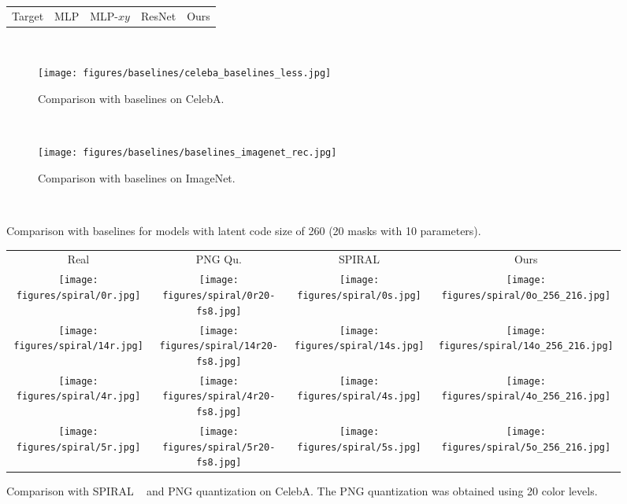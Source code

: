 \documentclass[10pt,twocolumn,letterpaper]{article}
\begin{document}
\begin{figure}[H]
\begin{center}
\begin{tabularx}{\linewidth}{@{} *5{>{\centering\arraybackslash}X}@{}}

 Target & MLP & MLP-$xy$ & ResNet & Ours \\ 
\end{tabularx}\\

\begin{subfigure}[b]{0.5\textwidth}
\texttt{[image: figures/baselines/celeba\_baselines\_less.jpg]}
\caption{Comparison with baselines on CelebA.}
\label{fig:baselineComparison_20masks_celeba}
\end{subfigure}\\
\begin{subfigure}[b]{0.5\textwidth}
\texttt{[image: figures/baselines/baselines\_imagenet\_rec.jpg]}
\caption{Comparison with baselines on ImageNet.}
\label{fig:baselineComparison_20masks_imagenet}
\end{subfigure}\\
\caption{Comparison with baselines for models with latent code size of 260 (20 masks with 10 parameters).}
\end{center}
\end{figure}

\setlength{\tabcolsep}{1pt}
\begin{figure}[b]
\begin{center}
\begin{tabular}{cccc}
Real & PNG Qu. & SPIRAL & Ours \\
\texttt{[image: figures/spiral/0r.jpg]}&
\texttt{[image: figures/spiral/0r20-fs8.jpg]}&
\texttt{[image: figures/spiral/0s.jpg]}&
\texttt{[image: figures/spiral/0o\_256\_216.jpg]}\\
\texttt{[image: figures/spiral/14r.jpg]}&
\texttt{[image: figures/spiral/14r20-fs8.jpg]}&
\texttt{[image: figures/spiral/14s.jpg]}&
\texttt{[image: figures/spiral/14o\_256\_216.jpg]}\\
\texttt{[image: figures/spiral/4r.jpg]}&
\texttt{[image: figures/spiral/4r20-fs8.jpg]}&
\texttt{[image: figures/spiral/4s.jpg]}&
\texttt{[image: figures/spiral/4o\_256\_216.jpg]}\\
\texttt{[image: figures/spiral/5r.jpg]}&
\texttt{[image: figures/spiral/5r20-fs8.jpg]}&
\texttt{[image: figures/spiral/5s.jpg]}&
\texttt{[image: figures/spiral/5o\_256\_216.jpg]}\\
\end{tabular}
\end{center}
\vspace{-4mm}
 \caption{Comparison with SPIRAL ~\cite{ganin2018synthesizing} and PNG quantization on CelebA. The PNG quantization \cite{pngquant} was obtained using 20 color levels.}
\label{fig:compSpiral}
\end{figure}
\end{document}
